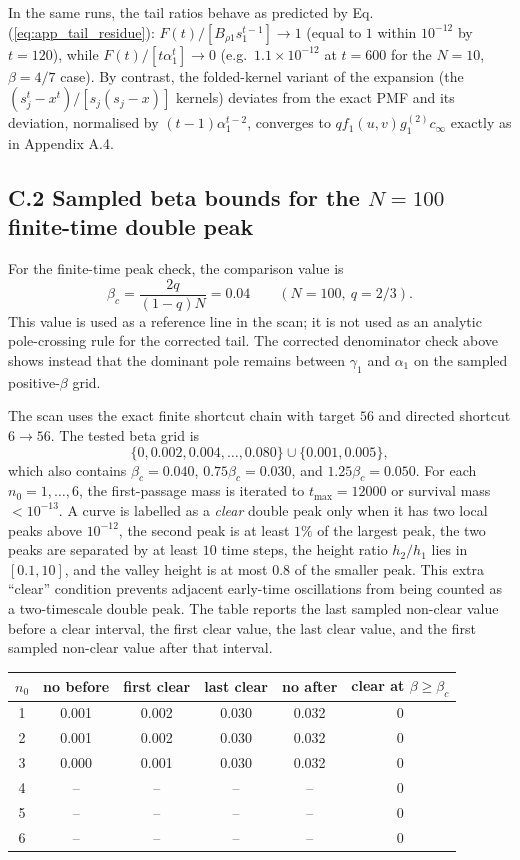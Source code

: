 \documentclass[superscriptaddress, amsmath, amssymb, aps, pre, floatfix]{revtex4-2}
\begin{document}
In the same runs, the tail ratios behave as predicted by Eq. (\ref{eq:app_tail_residue}):
\(F(t)/[B_{\rho1}s_1^{t-1}]\to1\) (equal to \(1\) within \(10^{-12}\) by \(t=120\)),
while \(F(t)/[t\alpha_1^t]\to0\) (e.g.\ \(1.1\times10^{-12}\) at \(t=600\) for the
\(N=10\), \(\beta=4/7\) case).  By contrast, the folded-kernel variant of the expansion
(the \((s_j^t-x^t)/[s_j(s_j-x)]\) kernels) deviates from the exact PMF and its deviation,
normalised by \((t-1)\alpha_1^{t-2}\), converges to \(qf_1(u,v)g^{(2)}_1c_\infty\) exactly
as in Appendix A.4.

\subsection*{\texorpdfstring{C.2 Sampled beta bounds for the \(N=100\) finite-time double peak}{C.2 Sampled beta bounds for the N=100 finite-time double peak}}

For the finite-time peak check, the comparison value is
\[
  \beta_c=\frac{2q}{(1-q)N}=0.04
  \qquad (N=100,\ q=2/3).
\]
This value is used as a reference line in the scan; it is not used as an analytic pole-crossing rule for the corrected tail.  The corrected denominator check above shows instead that the dominant pole remains between \(\gamma_1\) and \(\alpha_1\) on the sampled positive-\(\beta\) grid.

The scan uses the exact finite shortcut chain with target \(56\) and directed shortcut \(6\to56\).  The tested beta grid is
\[
  \{0,0.002,0.004,\ldots,0.080\}
  \cup\{0.001,0.005\},
\]
which also contains \(\beta_c=0.040\), \(0.75\beta_c=0.030\), and \(1.25\beta_c=0.050\).  For each \(n_0=1,\ldots,6\), the first-passage mass is iterated to \(t_{\max}=12000\) or survival mass \(<10^{-13}\).  A curve is labelled as a \emph{clear} double peak only when it has two local peaks above \(10^{-12}\), the second peak is at least \(1\%\) of the largest peak, the two peaks are separated by at least \(10\) time steps, the height ratio \(h_2/h_1\) lies in \([0.1,10]\), and the valley height is at most \(0.8\) of the smaller peak.  This extra ``clear'' condition prevents adjacent early-time oscillations from being counted as a two-timescale double peak.  The table reports the last sampled non-clear value before a clear interval, the first clear value, the last clear value, and the first sampled non-clear value after that interval.

\begin{center}
\scriptsize
\begin{tabular}{cccccc}
\hline
\(n_0\) & no before & first clear & last clear & no after & clear at \(\beta\geq\beta_c\)\\
\hline
1 & 0.001 & 0.002 & 0.030 & 0.032 & 0\\
2 & 0.001 & 0.002 & 0.030 & 0.032 & 0\\
3 & 0.000 & 0.001 & 0.030 & 0.032 & 0\\
4 & -- & -- & -- & -- & 0\\
5 & -- & -- & -- & -- & 0\\
6 & -- & -- & -- & -- & 0\\
\hline
\end{tabular}
\end{center}
\normalsize
\end{document}

